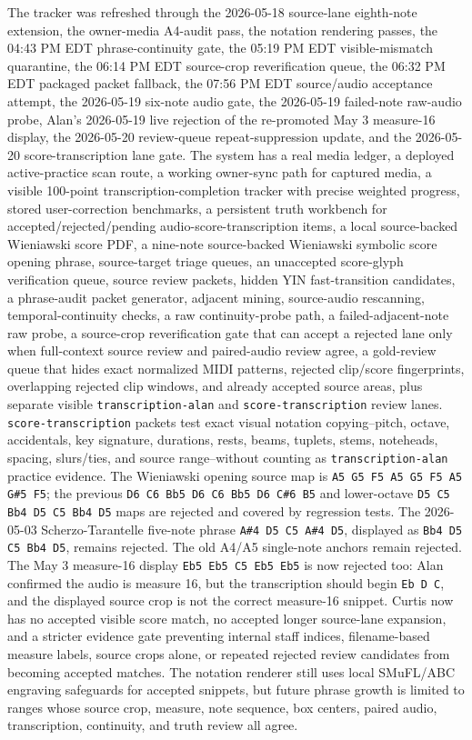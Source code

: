 The tracker was refreshed through the 2026-05-18 source-lane eighth-note extension, the owner-media A4-audit pass, the notation rendering passes, the 04:43 PM EDT phrase-continuity gate, the 05:19 PM EDT visible-mismatch quarantine, the 06:14 PM EDT source-crop reverification queue, the 06:32 PM EDT packaged packet fallback, the 07:56 PM EDT source/audio acceptance attempt, the 2026-05-19 six-note audio gate, the 2026-05-19 failed-note raw-audio probe, Alan's 2026-05-19 live rejection of the re-promoted May 3 measure-16 display, the 2026-05-20 review-queue repeat-suppression update, and the 2026-05-20 score-transcription lane gate. The system has a real media ledger, a deployed active-practice scan route, a working owner-sync path for captured media, a visible 100-point transcription-completion tracker with precise weighted progress, stored user-correction benchmarks, a persistent truth workbench for accepted/rejected/pending audio-score-transcription items, a local source-backed Wieniawski score PDF, a nine-note source-backed Wieniawski symbolic score opening phrase, source-target triage queues, an unaccepted score-glyph verification queue, source review packets, hidden YIN fast-transition candidates, a phrase-audit packet generator, adjacent mining, source-audio rescanning, temporal-continuity checks, a raw continuity-probe path, a failed-adjacent-note raw probe, a source-crop reverification gate that can accept a rejected lane only when full-context source review and paired-audio review agree, a gold-review queue that hides exact normalized MIDI patterns, rejected clip/score fingerprints, overlapping rejected clip windows, and already accepted source areas, plus separate visible \texttt{transcription-alan} and \texttt{score-transcription} review lanes. \texttt{score-transcription} packets test exact visual notation copying--pitch, octave, accidentals, key signature, durations, rests, beams, tuplets, stems, noteheads, spacing, slurs/ties, and source range--without counting as \texttt{transcription-alan} practice evidence. The Wieniawski opening source map is \texttt{A5 G5 F5 A5 G5 F5 A5 G\#5 F5}; the previous \texttt{D6 C6 Bb5 D6 C6 Bb5 D6 C\#6 B5} and lower-octave \texttt{D5 C5 Bb4 D5 C5 Bb4 D5} maps are rejected and covered by regression tests. The 2026-05-03 Scherzo-Tarantelle five-note phrase \texttt{A\#4 D5 C5 A\#4 D5}, displayed as \texttt{Bb4 D5 C5 Bb4 D5}, remains rejected. The old A4/A5 single-note anchors remain rejected. The May 3 measure-16 display \texttt{Eb5 Eb5 C5 Eb5 Eb5} is now rejected too: Alan confirmed the audio is measure 16, but the transcription should begin \texttt{Eb D C}, and the displayed source crop is not the correct measure-16 snippet. Curtis now has no accepted visible score match, no accepted longer source-lane expansion, and a stricter evidence gate preventing internal staff indices, filename-based measure labels, source crops alone, or repeated rejected review candidates from becoming accepted matches. The notation renderer still uses local SMuFL/ABC engraving safeguards for accepted snippets, but future phrase growth is limited to ranges whose source crop, measure, note sequence, box centers, paired audio, transcription, continuity, and truth review all agree.

